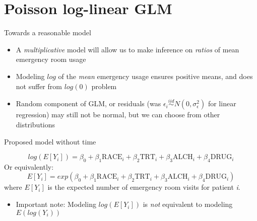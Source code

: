 \documentclass[
  ignorenonframetext,
]{beamer}
\providecommand{\tightlist}{%
  \setlength{\itemsep}{0pt}\setlength{\parskip}{0pt}}
\begin{document}
\hypertarget{poisson-log-linear-glm}{%
\section{Poisson log-linear GLM}\label{poisson-log-linear-glm}}

\begin{frame}{Towards a reasonable model}
\protect\hypertarget{towards-a-reasonable-model}{}

\begin{itemize}
\tightlist
\item
  A \emph{multiplicative} model will allow us to make inference on
  \emph{ratios} of mean emergency room usage
\item
  Modeling \(log\) of the \emph{mean} emergency usage ensures positive
  means, and does not suffer from \(log(0)\) problem
\item
  Random component of GLM, or residuals (was
  \(\epsilon_i \stackrel{iid}{\sim} N(0, \sigma_\epsilon^2)\) for linear
  regression) may still not be normal, but we can choose from other
  distributions
\end{itemize}

\end{frame}

\begin{frame}{Proposed model without time}
\protect\hypertarget{proposed-model-without-time}{}

\[
log(E[Y_i]) = \beta_0 + \beta_1 \textrm{RACE}_i + \beta_2 \textrm{TRT}_i + \beta_3 \textrm{ALCH}_i + \beta_4 \textrm{DRUG}_i
\] Or equivalently: \[
E[Y_i] = exp \left( \beta_0 + \beta_1 \textrm{RACE}_i + \beta_2 \textrm{TRT}_i + \beta_3 \textrm{ALCH}_i + \beta_4 \textrm{DRUG}_i \right)
\] where \(E[Y_i]\) is the expected number of emergency room visits for
patient \emph{i}.

\begin{itemize}
\tightlist
\item
  Important note: Modeling \(log(E[Y_i])\) is \emph{not} equivalent to
  modeling \(E(log(Y_i))\)
\end{itemize}

\end{frame}
\end{document}

